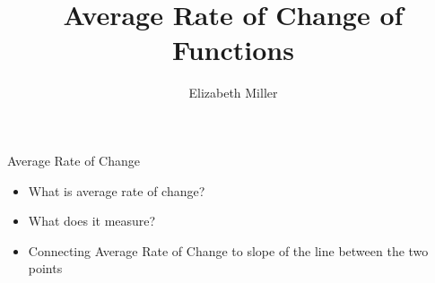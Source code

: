 \documentclass{ximera}
\author{Elizabeth Miller}
\title{Average Rate of Change of Functions}
\begin{document}
\begin{abstract}
\end{abstract}
\maketitle


\begin{objectives}

\item Average Rate of Change
\begin{itemize}
	\item What is average rate of change?
	\item What does it measure? 
	\item Connecting Average Rate of Change to slope of the line between the two points 
\end{itemize}




\end{objectives}
\end{document}
